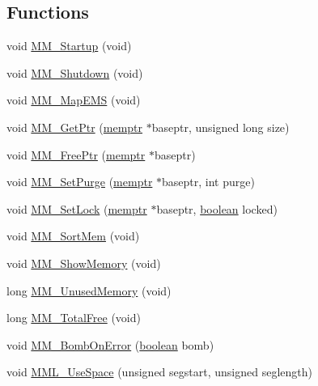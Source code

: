 \subsection*{Functions}
\begin{DoxyCompactItemize}
\item 
void \hyperlink{ID__MM_8H_aba99c48e5510e09666eee49955206aad}{MM\_\-Startup} (void)
\item 
void \hyperlink{ID__MM_8H_a11098a9c2f07a2b9ebda237a659b0ef3}{MM\_\-Shutdown} (void)
\item 
void \hyperlink{ID__MM_8H_a20e7b852401a185c1f4fca0efbb3758d}{MM\_\-MapEMS} (void)
\item 
void \hyperlink{ID__MM_8H_ab70f353278bae916507eb350c39f4ebb}{MM\_\-GetPtr} (\hyperlink{ID__MM_8H_a04062decc7eb282b066c65e9137bb9bf}{memptr} $\ast$baseptr, unsigned long size)
\item 
void \hyperlink{ID__MM_8H_a9464693cb68e9a8ed7586855952f197a}{MM\_\-FreePtr} (\hyperlink{ID__MM_8H_a04062decc7eb282b066c65e9137bb9bf}{memptr} $\ast$baseptr)
\item 
void \hyperlink{ID__MM_8H_a114de4a52bcc47e8d668ab78a7c702c9}{MM\_\-SetPurge} (\hyperlink{ID__MM_8H_a04062decc7eb282b066c65e9137bb9bf}{memptr} $\ast$baseptr, int purge)
\item 
void \hyperlink{ID__MM_8H_acbec6e3295a580e1067bbd69ea89d275}{MM\_\-SetLock} (\hyperlink{ID__MM_8H_a04062decc7eb282b066c65e9137bb9bf}{memptr} $\ast$baseptr, \hyperlink{ID__HEAD_8H_a7c6368b321bd9acd0149b030bb8275ed}{boolean} locked)
\item 
void \hyperlink{ID__MM_8H_a1ab3355666068dc56c6d591354b17a3e}{MM\_\-SortMem} (void)
\item 
void \hyperlink{ID__MM_8H_ac00e670ca581737e0e534b94959b5dbf}{MM\_\-ShowMemory} (void)
\item 
long \hyperlink{ID__MM_8H_aa26a7b3f7516bf637f814c67b4791800}{MM\_\-UnusedMemory} (void)
\item 
long \hyperlink{ID__MM_8H_a50561a6be4f4de9e6c017fc231d3e2a9}{MM\_\-TotalFree} (void)
\item 
void \hyperlink{ID__MM_8H_aec67dba21150a6028caa41540d8575ca}{MM\_\-BombOnError} (\hyperlink{ID__HEAD_8H_a7c6368b321bd9acd0149b030bb8275ed}{boolean} bomb)
\item 
void \hyperlink{ID__MM_8H_abf7ebac49c519babe994fbe8bb070d04}{MML\_\-UseSpace} (unsigned segstart, unsigned seglength)
\end{DoxyCompactItemize}
